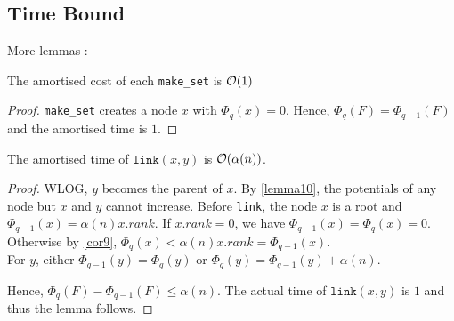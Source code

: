 \documentclass{cours}
\begin{document}
\subsection{Time Bound}
More lemmas :
\begin{lemma}
    The amortised cost of each \texttt{make\_set} is $\mathcal{O}(1)$
\end{lemma}
\begin{proof}
    \texttt{make\_set} creates a node $x$ with $\Phi_{q}(x) = 0$. Hence, $\Phi_{q}(F) = \Phi_{q - 1}(F)$ and the amortised time is $1$.
\end{proof}

\begin{lemma}
    The amortised time of $\texttt{link}(x, y)$ is $\mathcal{O}(\alpha(n))$.
\end{lemma}
\begin{proof}
    WLOG, $y$ becomes the parent of $x$. By \ref{lemma10}, the potentials of any node but $x$ and $y$ cannot increase. Before \texttt{link}, the node $x$ is a root and $\Phi_{q - 1}(x) = \alpha(n)x.rank$. If $x.rank = 0$, we have $\Phi_{q - 1}(x) = \Phi_{q}(x) = 0$. Otherwise by \ref{cor9}, $\Phi_{q}(x) < \alpha(n)x.rank = \Phi_{q - 1}(x)$.\\
    For $y$, either $\Phi_{q - 1}(y) = \Phi_{q}(y)$ or $\Phi_{q}(y) = \Phi_{q - 1}(y) + \alpha(n)$.

    Hence, $\Phi_{q}(F) - \Phi_{q - 1}(F) \leq \alpha(n)$. The actual time of $\texttt{link}(x, y)$ is $1$ and thus the lemma follows.
\end{proof}
\end{document}
